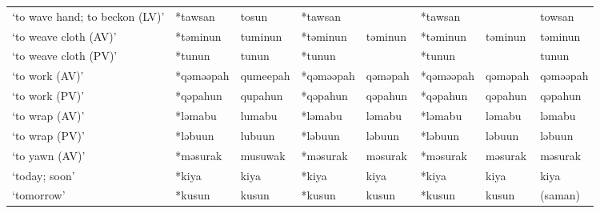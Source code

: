 \begin{landscape}
\begin{longtable}[c]{@{}p{3cm}<{\raggedright}p{2.75cm}<{\raggedright}p{2.75cm}<{\raggedright}p{2.75cm}<{\raggedright}p{2.75cm}<{\raggedright}p{2.75cm}<{\raggedright}p{2.75cm}<{\raggedright}p{2.75cm}<{\raggedright}@{}}
`to wave hand; to beckon (LV)'                       & *tawsan            & tosun                          & *tawsan            &                            & *tawsan          &                          & towsan                            \\
`to weave cloth (AV)'                                & *təminun           & tuminun                        & *təminun           & təminun                    & *təminun         & təminun                  & təminun                           \\
`to weave cloth (PV)'                                & *tunun             & tunun                          & *tunun             &                            & *tunun           &                          & tunun                             \\
`to work (AV)'                                       & *qəməəpah          & qumeepah                       & *qəməəpah          & qəməpah                    & *qəməəpah        & qəməpah                  & qəməəpah                          \\
`to work (PV)'                                       & *qəpahun           & qupahun                        & *qəpahun           & qəpahun                    & *qəpahun         & qəpahun                  & qəpahun                           \\
`to wrap (AV)'                                       & *ləmabu            & lumabu                         & *ləmabu            & ləmabu                     & *ləmabu          & ləmabu                   & ləmabu                            \\
`to wrap (PV)'                                       & *ləbuun            & lubuun                         & *ləbuun            & ləbuun                     & *ləbuun          & ləbuun                   & ləbuun                            \\
`to yawn (AV)'                                       & *məsurak           & musuwak                        & *məsurak           & məsurak                    & *məsurak         & məsurak                  & məsurak                           \\
`today; soon'                                        & *kiya              & kiya                           & *kiya              & kiya                       & *kiya            & kiya                     & kiya                              \\
`tomorrow'                                           & *kusun             & kusun                          & *kusun             & kusun                      & *kusun           & kusun                    & (saman)                           \\

\end{longtable}
\end{landscape}
